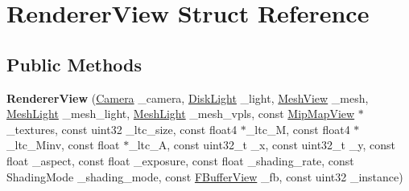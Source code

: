 \hypertarget{struct_renderer_view}{}\section{Renderer\+View Struct Reference}
\label{struct_renderer_view}
\subsection*{Public Methods}
\begin{DoxyCompactItemize}
\item 
\mbox{\label{struct_renderer_view_aa8dd10068d9826e815882bf9b46adaec}} 
{\bfseries Renderer\+View} (\hyperlink{struct_camera}{Camera} \+\_\+camera, \hyperlink{struct_disk_light}{Disk\+Light} \+\_\+light, \hyperlink{struct_mesh_view}{Mesh\+View} \+\_\+mesh, \hyperlink{struct_mesh_light}{Mesh\+Light} \+\_\+mesh\+\_\+light, \hyperlink{struct_mesh_light}{Mesh\+Light} \+\_\+mesh\+\_\+vpls, const \hyperlink{struct_mip_map_view}{Mip\+Map\+View} $\ast$\+\_\+textures, const uint32 \+\_\+ltc\+\_\+size, const float4 $\ast$\+\_\+ltc\+\_\+M, const float4 $\ast$\+\_\+ltc\+\_\+\+Minv, const float $\ast$\+\_\+ltc\+\_\+A, const uint32\+\_\+t \+\_\+x, const uint32\+\_\+t \+\_\+y, const float \+\_\+aspect, const float \+\_\+exposure, const float \+\_\+shading\+\_\+rate, const Shading\+Mode \+\_\+shading\+\_\+mode, const \hyperlink{struct_f_buffer_view}{F\+Buffer\+View} \+\_\+fb, const uint32 \+\_\+instance)
\end{DoxyCompactItemize}
